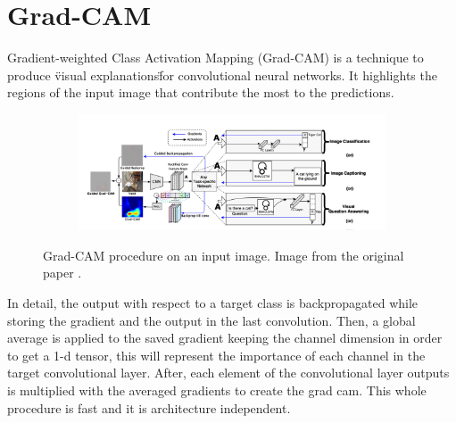 \documentclass[../document.tex]{subfiles}
\begin{document}
\section{Grad-CAM}
Gradient-weighted Class Activation Mapping (Grad-CAM) \cite{gradcam} is a technique to produce \"visual explanations\" for convolutional neural networks. It highlights the regions of the input image that contribute the most to the predictions. 
\begin{figure} [htbp]
    \centering
    \begin{subfigure}[b]{1\textwidth}
        \includegraphics[width=\linewidth]{../img/5/grad_cam1.png}
    \end{subfigure}
\caption{Grad-CAM procedure on an input image. Image from the original paper \cite{gradcam}.}
\end{figure}
In detail, the output with respect to a target class is backpropagated while storing the gradient and the output in the last convolution. Then, a global average is applied to the saved gradient keeping the channel dimension in order to get a 1-d tensor, this will represent the importance of each channel in the target convolutional layer. After, each element of the convolutional layer outputs is multiplied with the averaged gradients to create the grad cam. This whole procedure is fast and it is architecture independent.



%
\end{document}
